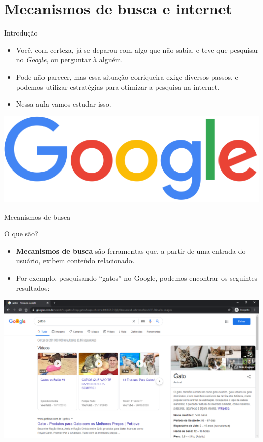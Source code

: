 \section{Mecanismos de busca e internet}


\begin{frame}{Introdução}
	\begin{block}{}
		\begin{itemize}
			\item Você, com certeza, já se deparou com algo que não sabia, e teve que pesquisar no \textit{Google}, ou perguntar à alguém.
			\item Pode não parecer, mas essa situação corriqueira exige diversos passos, e podemos utilizar estratégias para otimizar a pesquisa na internet.
			\item Nessa aula vamos estudar isso.
		\end{itemize}
	\end{block}

	\bigskip

	\centering
	\includegraphics[width=0.7\linewidth]{Figuras/Ch03/fig1.1}
\end{frame}


\begin{frame}{Mecanismos de busca}
	\begin{block}{O que são?}
		\begin{itemize}
			\item \textbf{Mecanismos de busca} são ferramentas que, a partir de uma entrada do usuário, exibem conteúdo relacionado.
			\item Por exemplo, pesquisando ``gatos'' no Google, podemos encontrar os seguintes resultados:
		\end{itemize}
	\end{block}

	\centering
	\includegraphics[width=0.75\linewidth]{Figuras/Ch03/fig1}
\end{frame}

